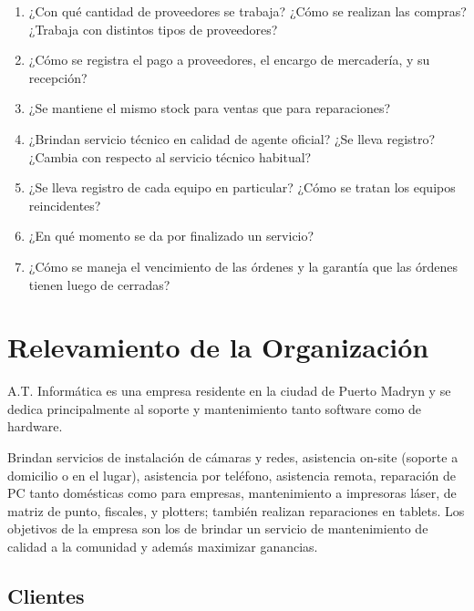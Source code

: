 \documentclass[12pt]{extarticle}
\begin{document}
\begin{spacing}{1.2}
\begin{enumerate}
            \item ¿Con qué cantidad de proveedores se trabaja? ¿Cómo se realizan las compras? ¿Trabaja con distintos tipos de proveedores?
            \item ¿Cómo se registra el pago a proveedores, el encargo de mercadería, y su recepción?
            \item ¿Se mantiene el mismo stock para ventas que para reparaciones?
            \item ¿Brindan servicio técnico en calidad de agente oficial? ¿Se lleva registro? ¿Cambia con respecto al servicio técnico habitual?
            \item ¿Se lleva registro de cada equipo en particular? ¿Cómo se tratan los equipos reincidentes?
            \item ¿En qué momento se da por finalizado un servicio?
            \item ¿Cómo se maneja el vencimiento de las órdenes y la garantía que las órdenes tienen luego de cerradas?
        \end{enumerate}

        \pagebreak









        \section{Relevamiento de la Organización}
        A.T. Informática es una empresa residente en la ciudad de Puerto Madryn y se dedica principalmente al soporte y mantenimiento tanto software como de hardware.

        Brindan servicios de instalación de cámaras y redes, asistencia on-site (soporte a domicilio o en el lugar), asistencia por teléfono, asistencia remota, reparación de PC tanto domésticas como para empresas, mantenimiento a impresoras láser, de matriz de punto, fiscales, y plotters; también realizan reparaciones en tablets.  Los objetivos de la empresa son los de brindar un servicio de mantenimiento de calidad a la comunidad y además maximizar ganancias.\\

        \pagebreak
        \subsection{Clientes}


\end{spacing}
\end{document}
